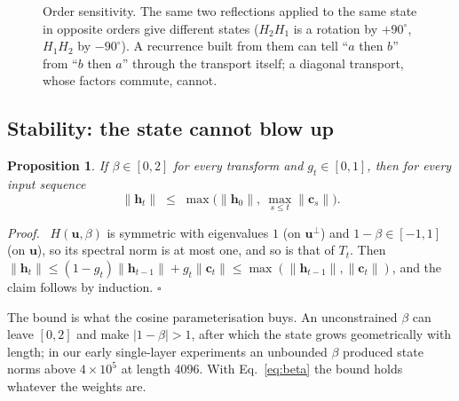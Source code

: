 \documentclass[10pt]{article}
\newtheorem{proposition}{Proposition}
\newenvironment{proof}{\par\noindent\textit{Proof.}\ }{\hfill$\square$\par\medskip}
\newcommand{\bu}{\mathbf{u}}
\newcommand{\bh}{\mathbf{h}}
\newcommand{\bc}{\mathbf{c}}
\begin{document}
\begin{figure}[t]
\centering
{}
\caption{Order sensitivity. The same two reflections applied to the same state in opposite orders give
different states ($H_2H_1$ is a rotation by $+90^\circ$, $H_1H_2$ by $-90^\circ$). A recurrence built from
them can tell ``$a$ then $b$'' from ``$b$ then $a$'' through the transport itself; a diagonal transport,
whose factors commute, cannot.}
\label{fig:order}
\end{figure}

\subsection{Stability: the state cannot blow up}

\begin{proposition}
\label{prop:bounded}
If $\beta\in[0,2]$ for every transform and $g_t\in[0,1]$, then for every input sequence
\[ \|\bh_t\| \;\le\; \max\big(\|\bh_0\|,\ \max_{s\le t}\|\bc_s\|\big). \]
\end{proposition}
\begin{proof}
$H(\bu,\beta)$ is symmetric with eigenvalues $1$ (on $\bu^\perp$) and $1-\beta\in[-1,1]$ (on $\bu$), so its
spectral norm is at most one, and so is that of $T_t$. Then
$\|\bh_t\|\le(1-g_t)\|\bh_{t-1}\|+g_t\|\bc_t\|\le\max(\|\bh_{t-1}\|,\|\bc_t\|)$, and the claim follows by
induction.
\end{proof}

The bound is what the cosine parameterisation buys. An unconstrained $\beta$ can leave $[0,2]$ and make
$|1-\beta|>1$, after which the state grows geometrically with length; in our early single-layer
experiments an unbounded $\beta$ produced state norms above $4\times10^5$ at length 4096. With
Eq.~\ref{eq:beta} the bound holds whatever the weights are.
\end{document}
